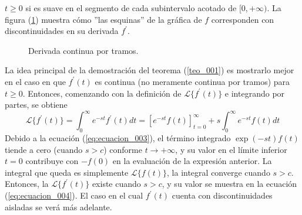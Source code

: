 $t \geq 0$ si es suave en el segmento de cada subintervalo acotado de $[0, +\infty)$. La figura (\ref{fig:figura_001}) muestra cómo ''las esquinas'' de la gráfica de $f$ corresponden con discontinuidades en su derivada $f^{\prime}$.
\begin{figure}
\centering

\label{fig:figura_001}
\caption{Derivada continua por tramos.}
\end{figure}
La idea principal de la demostración del teorema (\ref{teo_001}) es mostrarlo mejor en el caso en que $f^{\prime}(t)$ es continua (no meramente continua por tramos) para $t \geq 0$. Entonces, comenzando con la definición de $\mathscr{L}         \{f^{\prime}(t) \}$ e integrando por partes, se obtiene
\[ \mathscr{L} \{f^{\prime}(t) \} = \int_{0}^{\infty} e^{-st} f^{\prime}(t) dt = \left[ e^{-st} f(t) \right]_{t=0}^{\infty} + s \int_{0}^{\infty} e^{-st} f(t) dt \]
Debido a la ecuación (\ref{eq:ecuacion_003}), el término integrado $\exp(-st) f(t)$ tiende a cero (cuando $s > c$) conforme $t \to +\infty$, y su valor en el límite inferior $t=0$ contribuye con $-f(0)$ en la evaluación de la expresión anterior. La integral que queda es simplemente $\mathscr{L} \{ f(t) \} $, la integral converge cuando $s > c$. Entonces, la $\mathscr{L} \{ f^{\prime}(t) \}$ existe cuando $s > c$, y su valor se muestra en la ecuación (\ref{eq:ecuacion_004}). El caso en el cual $f^{\prime}(t)$ cuenta con discontinuidades aisladas se verá más adelante.

